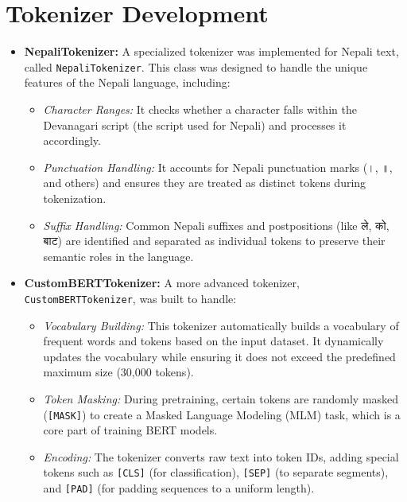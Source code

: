 \section{Tokenizer Development}
\begin{itemize}
    \item \textbf{NepaliTokenizer:} A specialized tokenizer was implemented for Nepali text, called \texttt{NepaliTokenizer}. This class was designed to handle the unique features of the Nepali language, including:
    \begin{itemize}
        \item \textit{Character Ranges:} It checks whether a character falls within the Devanagari script (the script used for Nepali) and processes it accordingly.
        \item \textit{Punctuation Handling:} It accounts for Nepali punctuation marks (\textsanskrit{।}, \textsanskrit{॥}, and others) and ensures they are treated as distinct tokens during tokenization.
        \item \textit{Suffix Handling:} Common Nepali suffixes and postpositions (like \textsanskrit{ले}, \textsanskrit{को}, \textsanskrit{बाट}) are identified and separated as individual tokens to preserve their semantic roles in the language.
    \end{itemize}
    \item \textbf{CustomBERTTokenizer:} A more advanced tokenizer, \texttt{CustomBERTTokenizer}, was built to handle:
    \begin{itemize}
        \item \textit{Vocabulary Building:} This tokenizer automatically builds a vocabulary of frequent words and tokens based on the input dataset. It dynamically updates the vocabulary while ensuring it does not exceed the predefined maximum size (30,000 tokens).
        \item \textit{Token Masking:} During pretraining, certain tokens are randomly masked (\texttt{[MASK]}) to create a Masked Language Modeling (MLM) task, which is a core part of training BERT models.
        \item \textit{Encoding:} The tokenizer converts raw text into token IDs, adding special tokens such as \texttt{[CLS]} (for classification), \texttt{[SEP]} (to separate segments), and \texttt{[PAD]} (for padding sequences to a uniform length).
    \end{itemize}
\end{itemize}

